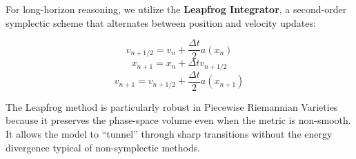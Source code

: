 \documentclass[12pt,a4paper]{article}
\begin{document}
For long-horizon reasoning, we utilize the \textbf{Leapfrog Integrator}, a second-order symplectic scheme that alternates between position and velocity updates:

\begin{equation}
v_{n+1/2} = v_n + \frac{\Delta t}{2} a(x_n)
\end{equation}
\begin{equation}
x_{n+1} = x_n + \Delta t v_{n+1/2}
\end{equation}
\begin{equation}
v_{n+1} = v_{n+1/2} + \frac{\Delta t}{2} a(x_{n+1})
\end{equation}

The Leapfrog method is particularly robust in Piecewise Riemannian Varieties because it preserves the phase-space volume even when the metric is non-smooth. It allows the model to ``tunnel'' through sharp transitions without the energy divergence typical of non-symplectic methods.
\end{document}
